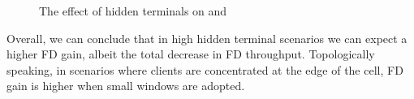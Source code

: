 \documentclass[10pt,journal,cspaper,compsoc]{IEEEtran}
\begin{document}
\begin{figure*}\centering
	\qquad
	\centering
	\caption{The effect of hidden terminals on  and }\label{fig:example2}\end{figure*}


Overall, we can conclude that in high hidden terminal scenarios we can expect a higher FD gain, albeit the total decrease in FD throughput. Topologically speaking, in scenarios where clients are concentrated at the edge of the cell, FD gain is higher when small windows are adopted.   
\end{document}
